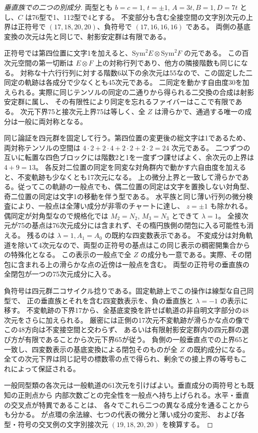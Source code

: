 \begin{proof}[垂直族での二つの別成分]
両型とも $b=c=1$, $t=\pm1$, $A=3t,B=1,D=7t$ とし、$C$ は76型で1、112型で4とする。
不変部分も含む全接空間の文字別次元の上界は正符号で $(17,18,20,20)$、負符号で $(17,16,16,16)$ である。
両側の基底変換の次元は先と同じで、射影安定群は有限である。

正符号では第四位置に文字1を加えると、$\mathrm{Sym}^2 E\otimes\mathrm{Sym}^2 F$ の元である。
この百次元空間の第一切断は $E\otimes F$ 上の対称行列であり、他方の隣接階数も同じになる。
対称な十六行行列に対する階数6以下の余次元は55なので、この固定した二同定の軌跡は各成分で少なくとも45次元である。
二同定を動かす自由度30を加えられる。実際に同じテンソルの同定の二通りから得られる二交換の合成は射影安定群に属し、
その有限性により同定を忘れるファイバーはここで有限である。
次元下界75と接次元上界75は等しく、全 $Z$ は滑らかで、通過する唯一の成分は一般に両対称となる。

同じ論証を四元群を固定して行う。第四位置の変更後の総文字は1であるため、両対称テンソルの空間は
$4\cdot2+2\cdot4+2\cdot2+2\cdot2=24$ 次元である。
二つずつの互いに転置な四色ブロックには階数2と1を一度ずつ課せばよく、余次元の上界は $4+9=13$。
各反対二位置の同定を同変な対角群内で動かす六自由度を加えると、不変軌跡も少なくとも17次元になる。
上の微分上界と一致して滑らかである。従ってこの軌跡の一般点でも、偶二位置の同定は文字を置換しない対角型、
奇二位置の同定は文字1の移動を伴う型である。
水平族と同じ薄い行列の微分検査により、一般点は全薄い成分が非零のチャートに達し、
$z=\pm1$ も除かれる。偶同定が対角型なので規格化では $M_2=N_2$, $M_3=N_3$ とできて $\lambda=1$。
全接次元が75の基点は76次元成分には含まれず、その楕円族側の閉包に入る可能性も消える。
残るのは $\lambda=1,A_1=A_0$ の既約な四変数表示である。
不変成分は対角軌道を除いて4次元なので、両型の正符号の基点はこの同じ表示の稠密開集合からの特殊化となる。
この表示の一般点で全 $Z$ の成分も一意である。実際、その閉包に含まれる上の滑らかな点の近傍は一般点を含む。
両型の正符号の垂直族の全閉包が一つの75次元成分に入る。

負符号は四元群二コサイクル捻りである。固定軌跡上でこの操作は線型な自己同型で、
正の垂直族とそれを含む四変数表示を、負の垂直族と $\lambda=-1$ の表示に移す。
不変軌跡の下界17から、全基底変換を許せば軌道の非自明文字部分の48次元をさらに加えられる。
厳密には正側の17次元不変軌跡が滑らかな点の像でこの48方向は不変接空間と交わらず、
あるいは有限射影安定群内の四元群の選び方が有限であることから次元下界65が従う。
負側の一般垂直点での上界65と一致し、四変数表示の基底変換による閉包そのものが全 $Z$ の既約成分になる。
全ての次元下界は同じ記号の標数零の点で得られ、剰余での接上界の等号もこれによって保証される。

一般同型類の各次元は一般軌道の61次元を引けばよい。垂直成分の両符号とも既知の正則点から
内部次数ごとの完全性を一般点へ持ち上げられる。水平・垂直の交叉点が特異であることは、
各々でこれら二つの異なる成分を通ることからも分かる。
 が点環の余法線、七つの代表の微分と薄い成分の変形、
および各型・符号の交叉例の文字別接次元 $(19,18,20,20)$ を検算する。
\end{proof}
